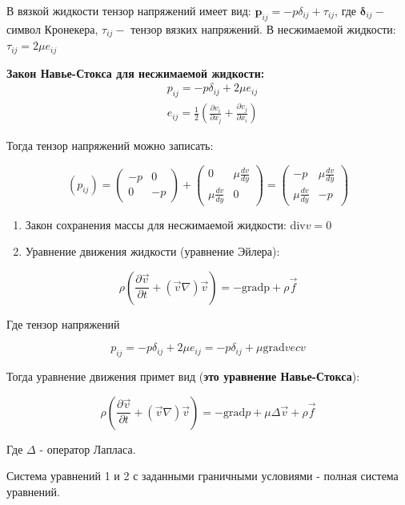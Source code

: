 В вязкой жидкости тензор напряжений имеет вид: $\boldsymbol{p}_{i j}=-p \delta_{i j}+\tau_{i j}$, где $\boldsymbol{\delta}_{i j}-$ символ Кронекера, $\tau_{i j}-$ тензор вязких напряжений. В несжимаемой жидкости: $\tau_{i j}=2 \mu e_{i j}$

\textbf{Закон Навье-Стокса для несжимаемой жидкости:}
$$
\begin{aligned}
& p_{i j}=-p \delta_{i j}+2 \mu e_{i j} \\
& e_{i j}=\frac{1}{2}\left(\frac{\partial v_{i}}{\partial x_{j}}+\frac{\partial v_{j}}{\partial x_{i}}\right)
\end{aligned}
$$

Тогда тензор напряжений можно записать:

$$
\left(p_{i j}\right)=\left(\begin{array}{cc}
-p & 0 \\
0 & -p
\end{array}\right)+\left(\begin{array}{cc}
0 & \mu \frac{d v}{d y} \\
\mu \frac{d v}{d y} & 0
\end{array}\right)=\left(\begin{array}{cc}
-p & \mu \frac{d v}{d y} \\
\mu \frac{d v}{d y} & -p
\end{array}\right)
$$

\begin{enumerate}
  \item Закон сохранения массы для несжимаемой жидкости: $\mathrm{div} v=0$
  \item Уравнение движения жидкости (уравнение Эйлера):
\end{enumerate}

$$
\rho\left(\frac{\partial \vec{v}}{\partial t}+(\vec{v} \nabla) \vec{v}\right)=-\mathrm{gradp}+\rho \vec{f}
$$

Где тензор напряжений

$$
p_{i j}=-p \delta_{i j}+2 \mu e_{i j}=-p \delta_{i j}+\mu \mathrm{grad} vec{v}
$$

Тогда уравнение движения примет вид (\textbf{это уравнение Навье-Стокса}):

$$
\rho\left(\frac{\partial \vec{v}}{\partial t}+(\vec{v} \nabla) \vec{v}\right)=-\mathrm{grad} p+\mu \Delta \vec{v}+\rho \vec{f}
$$

Где $\Delta$ - оператор Лапласа.


Система уравнений 1 и 2 с заданными граничными условиями - полная система уравнений.


